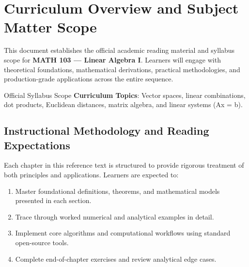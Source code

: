 \section{Curriculum Overview and Subject Matter Scope}

This document establishes the official academic reading material and syllabus scope for \textbf{MATH 103 --- Linear Algebra I}. Learners will engage with theoretical foundations, mathematical derivations, practical methodologies, and production-grade applications across the entire sequence.

\begin{InsightBox}{Official Syllabus Scope}
  \textbf{Curriculum Topics}: Vector spaces, linear combinations, dot products, Euclidean distances, matrix algebra, and linear systems (Ax = b).
\end{InsightBox}

\subsection{Instructional Methodology and Reading Expectations}

Each chapter in this reference text is structured to provide rigorous treatment of both principles and applications. Learners are expected to:
\begin{enumerate}
  \item Master foundational definitions, theorems, and mathematical models presented in each section.
  \item Trace through worked numerical and analytical examples in detail.
  \item Implement core algorithms and computational workflows using standard open-source tools.
  \item Complete end-of-chapter exercises and review analytical edge cases.
\end{enumerate}

